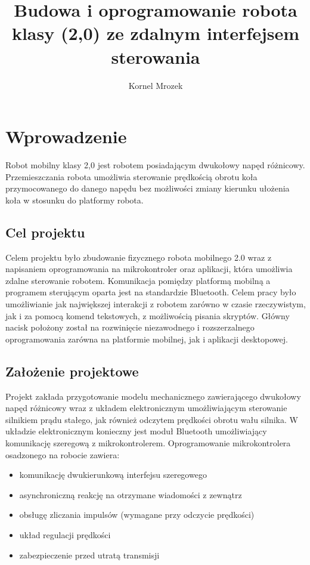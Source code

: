 \documentclass[eng,printmode]{mgr}
\title{Budowa i oprogramowanie robota klasy (2,0) ze zdalnym interfejsem sterowania}
\author{Kornel Mrozek}
\begin{document}

\maketitle %

\tableofcontents %

\chapter{Wprowadzenie}

Robot mobilny klasy 2,0 jest robotem posiadającym dwukołowy napęd różnicowy. Przemieszczania robota umożliwia sterowanie prędkością obrotu koła przymocowanego do danego napędu bez możliwości zmiany kierunku ułożenia koła w  stosunku do platformy robota. 

 \section{Cel projektu}

Celem projektu było zbudowanie fizycznego robota mobilnego 2.0 wraz z napisaniem oprogramowania na mikrokontroler oraz aplikacji, która umożliwia zdalne sterowanie robotem. Komunikacja pomiędzy platformą mobilną a programem sterującym oparta jest na standardzie Bluetooth. Celem pracy było umożliwianie  jak największej interakcji z robotem zarówno w czasie rzeczywistym, jak i za pomocą komend tekstowych, z możliwością pisania skryptów. Główny nacisk położony został na rozwinięcie niezawodnego i rozszerzalnego oprogramowania zarówna na platformie mobilnej, jak i aplikacji desktopowej. 

 \section{Założenie projektowe} 

Projekt zakłada przygotowanie modelu mechanicznego zawierającego dwukołowy napęd różnicowy wraz z  układem elektronicznym umożliwiającym sterowanie silnikiem prądu stałego, jak również odczytem prędkości obrotu wału silnika. W układzie elektronicznym konieczny jest moduł Bluetooth umożliwiający komunikację szeregową z mikrokontrolerem. Oprogramowanie mikrokontrolera osadzonego na robocie zawiera:
\begin{itemize}
  \item komunikację dwukierunkową interfejsu szeregowego
  \item asynchroniczną reakcję na otrzymane wiadomości z zewnątrz
  \item obsługę zliczania impulsów (wymagane przy odczycie prędkości)
  \item układ regulacji prędkości 
  \item zabezpieczenie przed utratą transmisji
\end{itemize}
\end{document}
